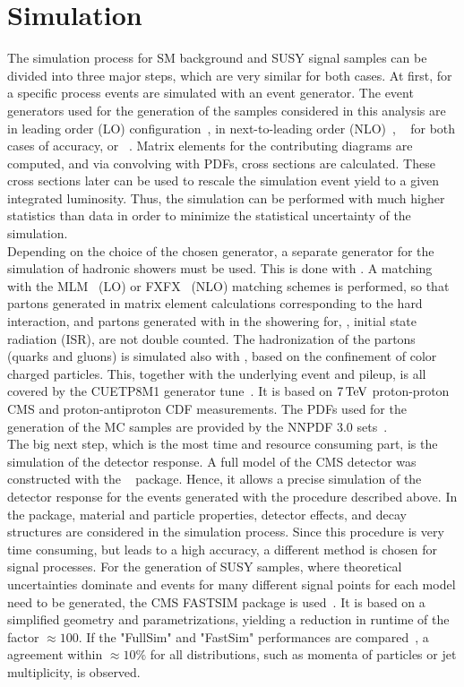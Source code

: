 \section{Simulation}\label{sec:Simulation}
The simulation process for SM background and SUSY signal samples can be divided into three major steps, which are very similar for both cases. At first, for a specific process events are simulated with an event generator. The event generators used for the generation of the samples considered in this analysis are  in leading order (LO) configuration~\cite{Madgraph1,Madgraph2,Madgraph3}, \MADANDMC in next-to-leading order (NLO)~\cite{Madgraph1,AMCATNLO}, \PYTHIA~\cite{Pythia} for both cases of accuracy, or \POWHEG~\cite{Powheg1,Powheg2}. Matrix elements for the contributing diagrams are computed, and via convolving with PDFs, cross sections are calculated. These cross sections later can be used to rescale the simulation event yield to a given integrated luminosity. Thus, the simulation can be performed with much higher statistics than data in order to minimize the statistical uncertainty of the simulation.\\
Depending on the choice of the chosen generator, a separate generator for the simulation of hadronic showers must be used. This is done with \PYTHIA. A matching with the \textsc{MLM}~\cite{Madgraph2} (LO) or \textsc{FXFX}~\cite{AMCATNLO} (NLO) matching schemes is performed, so that partons generated in matrix element calculations corresponding to the hard interaction, and partons generated with \PYTHIA in the showering for, \eg, initial state radiation (ISR), are not double counted. The hadronization of the partons (quarks and gluons) is simulated also with \PYTHIA, based on the confinement of color charged particles.  This, together with the underlying event and pileup, is all covered by the \textsc{CUETP8M1} generator tune~\cite{Tune}. It is based on $7\,\text{Te\hspace{-.08em}V}$ proton-proton CMS and proton-antiproton CDF measurements. The PDFs used for the generation of the MC samples are provided by the \textsc{NNPDF} 3.0 sets~\cite{NNPDF}.\\
The big next step, which is the most time and resource consuming part, is the simulation of the detector response. A full model of the CMS detector was constructed with the \GEANTfour~\cite{Geant} package. Hence, it allows a precise simulation of the detector response for the events generated with the procedure described above. In the \GEANTfour package, material and particle properties, detector effects, and decay structures are considered in the simulation process. Since this procedure is very time consuming, but leads to a high accuracy, a different method is chosen for signal processes. For the generation of SUSY samples, where theoretical uncertainties dominate and events for many different signal points for each model need to be generated, the CMS \textsc{FASTSIM} package is used~\cite{FastSim}. It is based on a simplified geometry and parametrizations, yielding a reduction in runtime of the factor $\approx100$. If the "FullSim" and "FastSim" performances are compared~\cite{FastSimQuality}, a agreement within $\approx10\%$ for all distributions, such as momenta of particles or jet multiplicity, is observed.\\
